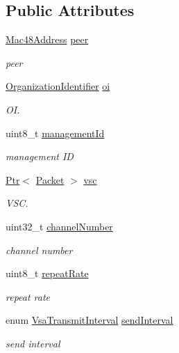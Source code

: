 \subsection*{Public Attributes}
\begin{DoxyCompactItemize}
\item 
\hyperlink{classns3_1_1Mac48Address}{Mac48\+Address} \hyperlink{structns3_1_1VsaInfo_a9aabfb3896a3bff488a870c6ed42bc39}{peer}
\begin{DoxyCompactList}\small\item\em peer \end{DoxyCompactList}\item 
\hyperlink{classns3_1_1OrganizationIdentifier}{Organization\+Identifier} \hyperlink{structns3_1_1VsaInfo_ade76bfaa8bd17d73c52dd88764511d2f}{oi}
\begin{DoxyCompactList}\small\item\em OI. \end{DoxyCompactList}\item 
uint8\+\_\+t \hyperlink{structns3_1_1VsaInfo_a0cb57fcddf16cf49780e580e9bbca452}{management\+Id}
\begin{DoxyCompactList}\small\item\em management ID \end{DoxyCompactList}\item 
\hyperlink{classns3_1_1Ptr}{Ptr}$<$ \hyperlink{classns3_1_1Packet}{Packet} $>$ \hyperlink{structns3_1_1VsaInfo_acbc9fabb7d77260ca285ab61f2999825}{vsc}
\begin{DoxyCompactList}\small\item\em V\+SC. \end{DoxyCompactList}\item 
uint32\+\_\+t \hyperlink{structns3_1_1VsaInfo_a72af25993c262cb6454afa073b0e1ab6}{channel\+Number}
\begin{DoxyCompactList}\small\item\em channel number \end{DoxyCompactList}\item 
uint8\+\_\+t \hyperlink{structns3_1_1VsaInfo_a816b5ae961ed99f295cf382216e3ea32}{repeat\+Rate}
\begin{DoxyCompactList}\small\item\em repeat rate \end{DoxyCompactList}\item 
enum \hyperlink{namespacens3_a417ab130a77d452a8b5014090665bcc1}{Vsa\+Transmit\+Interval} \hyperlink{structns3_1_1VsaInfo_a75c7e3b19d0b496e882f55d6829085cb}{send\+Interval}
\begin{DoxyCompactList}\small\item\em send interval \end{DoxyCompactList}\end{DoxyCompactItemize}


